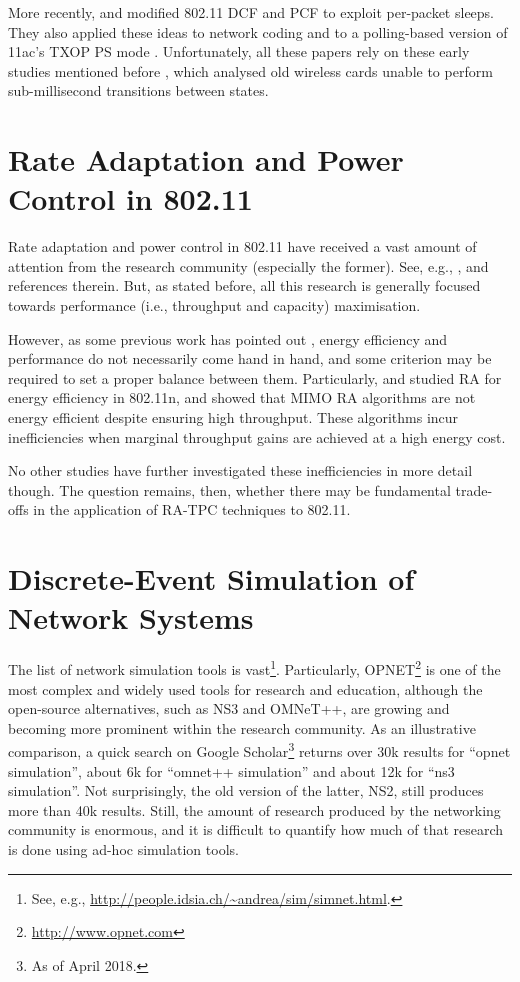 \documentclass[twoside,nohyper]{tufte-book}
\theoremstyle{definition}
\theoremstyle{definition}
\theoremstyle{definition}
\theoremstyle{remark}
\begin{document}
More recently, \citet{palacios2013a} and \citet{palacios2013b} modified
802.11 DCF and PCF to exploit per-packet sleeps. They also applied these
ideas to network coding \citep{palacios2015b} and to a polling-based
version of 11ac's TXOP PS mode \citep{palacios2015a}. Unfortunately, all
these papers rely on these early studies mentioned before
\citep{kamerman1997, havinga2000, jung2002}, which analysed old wireless
cards unable to perform sub-millisecond transitions between states.

\section{Rate Adaptation and Power Control in
802.11}\label{rate-adaptation-and-power-control-in-802.11-1}

Rate adaptation and power control in 802.11 have received a vast amount
of attention from the research community (especially the former). See,
e.g., \citet{biaz2008}, \citet{h-rca} and references therein. But, as
stated before, all this research is generally focused towards
performance (i.e., throughput and capacity) maximisation.

However, as some previous work has pointed out
\citep{tradeoff, balancing}, energy efficiency and performance do not
necessarily come hand in hand, and some criterion may be required to set
a proper balance between them. Particularly, \citet{Li2012} and
\citet{khan2013} studied RA for energy efficiency in 802.11n, and showed
that MIMO RA algorithms are not energy efficient despite ensuring high
throughput. These algorithms incur inefficiencies when marginal
throughput gains are achieved at a high energy cost.

No other studies have further investigated these inefficiencies in more
detail though. The question remains, then, whether there may be
fundamental trade-offs in the application of RA-TPC techniques to
802.11.

\section{Discrete-Event Simulation of Network
Systems}\label{discrete-event-simulation-of-network-systems}

The list of network simulation tools is vast\footnote{See, e.g.,
  \url{http://people.idsia.ch/~andrea/sim/simnet.html}.}. Particularly,
OPNET\footnote{\url{http://www.opnet.com}} is one of the most complex
and widely used tools for research and education, although the
open-source alternatives, such as NS3 and OMNeT++, are growing and
becoming more prominent within the research community. As an
illustrative comparison, a quick search on Google Scholar\footnote{As of
  April 2018.} returns over 30k results for ``opnet simulation'', about
6k for ``omnet++ simulation'' and about 12k for ``ns3 simulation''. Not
surprisingly, the old version of the latter, NS2, still produces more
than 40k results. Still, the amount of research produced by the
networking community is enormous, and it is difficult to quantify how
much of that research is done using ad-hoc simulation tools.
\end{document}
